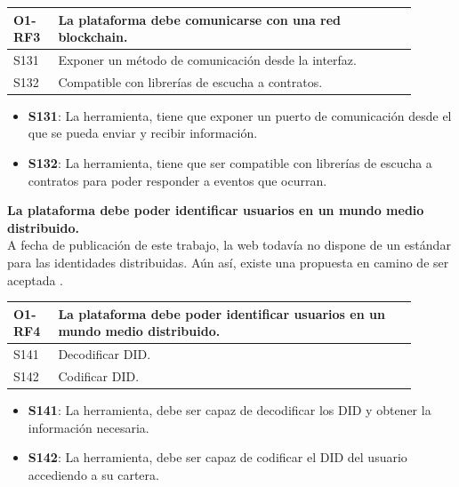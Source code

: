 \begin{center}
    \begin{table}[h!]
        \begin{tabular}{|p{0.1\linewidth} | p{0.8\linewidth}|}
            \hline
            \rowcolor{Gray} 
            \textbf{O1-RF3} & \textbf{La plataforma debe comunicarse con una red blockchain.} \\
            \hline
            S131            & Exponer un método de comunicación desde la interfaz. \\
            \hline
            S132            & Compatible con librerías de escucha a contratos. \\
            \hline
        \end{tabular}
    \end{table}
\end{center}
\begin{itemize}
    \item \textbf{S131}: La herramienta, tiene que exponer un puerto de comunicación desde el que se pueda enviar y recibir información.
    \item \textbf{S132}: La herramienta, tiene que ser compatible con librerías de escucha a contratos para poder responder a eventos que ocurran.
\end{itemize}
\textbf{La plataforma debe poder identificar usuarios en un mundo medio distribuido.}\\
A fecha de publicación de este trabajo, la web todavía no dispone de un estándar para las identidades distribuidas. Aún así, existe una propuesta en camino de ser aceptada \cite{web:did-spec}.
\begin{center}
    \begin{table}[h!]
        \begin{tabular}{|p{0.1\linewidth} | p{0.8\linewidth}|}
            \hline
            \rowcolor{Gray} 
            \textbf{O1-RF4} & \textbf{La plataforma debe poder identificar usuarios en un mundo medio distribuido.} \\
            \hline
            S141            & Decodificar DID. \\
            \hline
            S142            & Codificar DID. \\
            \hline
        \end{tabular}
    \end{table}
\end{center}
\begin{itemize}
    \item \textbf{S141}: La herramienta, debe ser capaz de decodificar los DID y obtener la información necesaria.
    \item \textbf{S142}: La herramienta, debe ser capaz de codificar el DID del usuario accediendo a su cartera.
\end{itemize}
